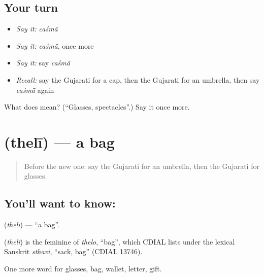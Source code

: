 \subsection*{Your turn}
\begin{itemize}
\raggedright
  \item \emph{Say it:} \emph{caśmā̃}
  \item \emph{Say it:} \emph{caśmā̃}, once more
  \item \emph{Say it:} say \emph{caśmā̃}
  \item \emph{Recall:} say the Gujarati for a cap, then the Gujarati for an umbrella, then say \emph{caśmā̃} again
\end{itemize}

\begin{tcolorbox}[breakable,colback=teal!4,colframe=teal!35!black,title={Before you move on}]
What does  mean? (\textquotedblleft{}Glasses, spectacles\textquotedblright{}.) Say it once more.
\end{tcolorbox}
\section[\texorpdfstring{\gu{થેલી} (thelī)}{થેલી (thelī)}]{ (thelī) — a bag}

\label{lesson:GU-C88-bag}



\begin{quote}
Before the new one: say the Gujarati for an umbrella, then the Gujarati for glasses.
\end{quote}

\subsection*{You'll want to know: }
\textbf{} (\emph{thelī}) — \textquotedblleft{}a bag\textquotedblright{}.

\begin{cousinweb}
\textbf{} (\emph{thelī}) is the feminine of \emph{thelo}, \textquotedblleft{}bag\textquotedblright{}, which CDIAL lists under the lexical Sanskrit \emph{sthavi}, \textquotedblleft{}sack, bag\textquotedblright{} (CDIAL 13746).
\end{cousinweb}

\begin{grammarlens}[title={What you've built}]
One more word for glasses, bag, wallet, letter, gift.
\end{grammarlens}

